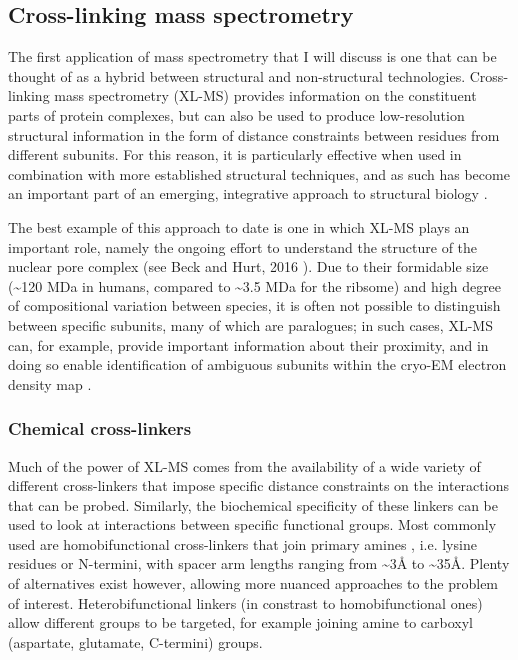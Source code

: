 \documentclass[a4paper,11pt,twoside,openright]{scrbook}
\begin{document}
\subsection{Cross-linking mass spectrometry}
The first application of mass spectrometry that I will discuss is one that can be thought of as a hybrid between structural and non-structural technologies. Cross-linking mass spectrometry (XL-MS) provides information on the constituent parts of protein complexes, but can also be used to produce low-resolution structural information in the form of distance constraints between residues from different subunits. For this reason, it is particularly effective when used in combination with more established structural techniques, and as such has become an important part of an emerging, integrative approach to structural biology \cite{Stengel2012,Ward2013,VandenBedem2015}.

The best example of this approach to date is one in which XL-MS plays an important role, namely the ongoing effort to understand the structure of the nuclear pore complex (see Beck and Hurt, 2016 \cite{Beck2016}). Due to their formidable size (\textasciitilde 120 MDa in humans, compared to \textasciitilde 3.5 MDa for the ribsome) and high degree of compositional variation between species, it is often not possible to distinguish between specific subunits, many of which are paralogues; in such cases, XL-MS can, for example, provide important information about their proximity, and in doing so enable identification of ambiguous subunits within the cryo-EM electron density map \cite{Bui2013}.

\subsubsection{Chemical cross-linkers}
Much of the power of XL-MS comes from the availability of a wide variety of different cross-linkers that impose specific distance constraints on the interactions that can be probed. Similarly, the biochemical specificity of these linkers can be used to look at interactions between specific functional groups. Most commonly used are homobifunctional cross-linkers that join primary amines \cite{Leitner2016}, i.e. lysine residues or N-termini, with spacer arm lengths ranging from \textasciitilde 3Å to \textasciitilde 35Å. Plenty of alternatives exist however, allowing more nuanced approaches to the problem of interest. Heterobifunctional linkers (in constrast to homobifunctional ones) allow different groups to be targeted, for example joining amine to carboxyl (aspartate, glutamate, C-termini) groups.
\end{document}
